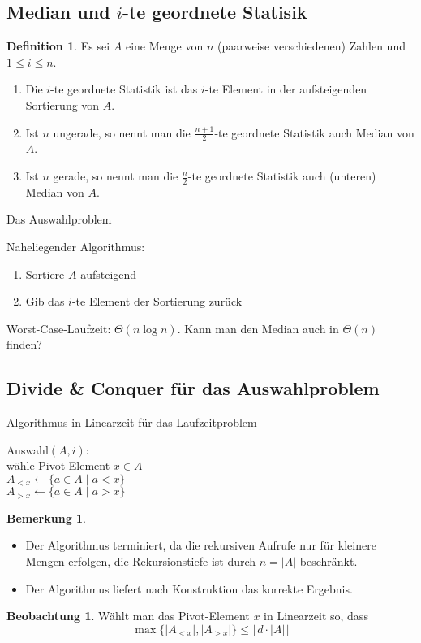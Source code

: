 \documentclass[a4paper,12pt]{article}
\theoremstyle{definition}
\newtheorem*{bemerkung}{Bemerkung}
\newtheorem*{beobachtung}{Beobachtung}
\newtheorem{definition}[axiom]{Definition}
\begin{document}
	\subsection{Median und $i$-te geordnete Statisik}
	\begin{definition}
		Es sei $A$ eine Menge von $n$ (paarweise verschiedenen) Zahlen und $1 \leq i \leq n$.
		\begin{enumerate}[label=(\alph*)]
			\item Die $i$-te geordnete Statistik ist das $i$-te Element in der aufsteigenden Sortierung von $A$.
			\item Ist $n$ ungerade, so nennt man die $\frac{n + 1}{2}$-te geordnete Statistik auch Median von $A$.
			\item Ist $n$ gerade, so nennt man die $\frac{n}{2}$-te geordnete Statistik auch (unteren) Median von $A$.
		\end{enumerate}
	\end{definition}
	\begin{algorithm}[H]
		\caption{Das Auswahlproblem}
	\end{algorithm}
	Naheliegender Algorithmus:
	\begin{enumerate}[label=(\arabic*)]
		\item Sortiere $A$ aufsteigend
		\item Gib das $i$-te Element der Sortierung zurück
	\end{enumerate}
	Worst-Case-Laufzeit: $\Theta(n \log n)$. Kann man den Median auch in $\Theta(n)$ finden?
	\subsection{Divide \& Conquer für das Auswahlproblem}
	\begin{algorithm}[H]
		\caption{Algorithmus in Linearzeit für das Laufzeitproblem}
		Auswahl$(A, i)$:\\
		wähle Pivot-Element $x \in A$\\
		$A_{<x} \gets \{a \in A \mid a < x\}$\\
		$A_{>x} \gets \{a \in A \mid a > x\}$\\
	\end{algorithm}
	\begin{bemerkung}
		\begin{itemize}
			\item Der Algorithmus terminiert, da die rekursiven Aufrufe nur für kleinere Mengen erfolgen, die Rekursionstiefe ist durch $n = \lvert A\rvert$ beschränkt.
			\item Der Algorithmus liefert nach Konstruktion das korrekte Ergebnis.
		\end{itemize}
	\end{bemerkung}
	\begin{beobachtung}
		Wählt man das Pivot-Element $x$ in Linearzeit so, dass
		\[
			\max\{\lvert A_{<x}\rvert, \lvert A_{>x}\rvert\} \leq \lfloor d \cdot \lvert A\rvert\rfloor
		\]
	\end{beobachtung}
\end{document}
